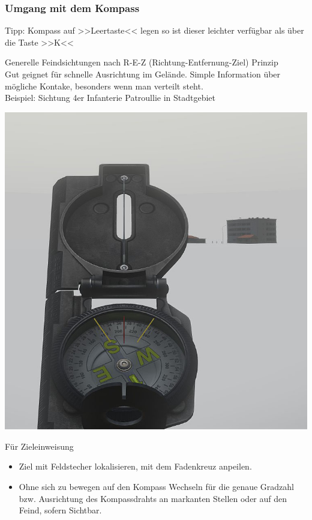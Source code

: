 \subsubsection{Umgang mit dem Kompass}

	Tipp: Kompass auf >>Leertaste<< legen so ist dieser leichter verfügbar als über die Taste >>K<<

	Generelle Feindsichtungen nach R-E-Z (Richtung-Entfernung-Ziel) Prinzip \\

	Gut geignet für schnelle Ausrichtung im Gelände. Simple Information über mögliche Kontake, besonders wenn man verteilt steht. \\


	Beispiel: Sichtung 4er Infanterie Patroullie in Stadtgebiet \\
\begin{minipage}[t]{1\textwidth}
	\includegraphics[width=\textwidth]{./img/fortgeschrittenes/karteUndMarkierungen/Kompass1.jpg}
\end{minipage}

	Für Zieleinweisung
		\begin{itemize}
 			\item Ziel mit Feldstecher lokalisieren, mit dem Fadenkreuz anpeilen.
			\item Ohne sich zu bewegen auf den Kompass Wechseln für die genaue Gradzahl bzw. Ausrichtung des Kompassdrahts an markanten Stellen oder auf den Feind, sofern Sichtbar.
		\end{itemize}

